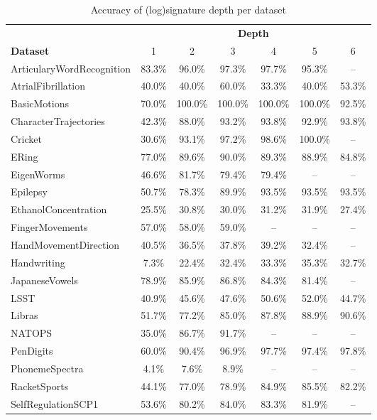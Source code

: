 \documentclass{article}
\theoremstyle{definition}
\theoremstyle{remark}
\begin{document}
	\begin{table}[h]
	\small
	\centering
	\caption{Accuracy of (log)signature depth per dataset}
	\label{tab:complete_results_depth}
	\begin{tabular}{lcccccc}
	\toprule
	& \multicolumn{6}{c}{\textbf{Depth}}\\
	 \cmidrule{2-7}
	\textbf{Dataset} & 1 & 2 & 3 & 4 & 5 & 6 \\
	\midrule
	ArticularyWordRecognition & 83.3\% & 96.0\% & 97.3\% & 97.7\% & 95.3\% & -- \\
	AtrialFibrillation & 40.0\% & 40.0\% & 60.0\% & 33.3\% & 40.0\% & 53.3\% \\
	BasicMotions & 70.0\% & 100.0\% & 100.0\% & 100.0\% & 100.0\% & 92.5\% \\
	CharacterTrajectories & 42.3\% & 88.0\% & 93.2\% & 93.8\% & 92.9\% & 93.8\% \\
	Cricket & 30.6\% & 93.1\% & 97.2\% & 98.6\% & 100.0\% & -- \\
	ERing & 77.0\% & 89.6\% & 90.0\% & 89.3\% & 88.9\% & 84.8\% \\
	EigenWorms & 46.6\% & 81.7\% & 79.4\% & 79.4\% & -- & -- \\
	Epilepsy & 50.7\% & 78.3\% & 89.9\% & 93.5\% & 93.5\% & 93.5\% \\
	EthanolConcentration & 25.5\% & 30.8\% & 30.0\% & 31.2\% & 31.9\% & 27.4\% \\
	FingerMovements & 57.0\% & 58.0\% & 59.0\% & -- & -- & -- \\
	HandMovementDirection & 40.5\% & 36.5\% & 37.8\% & 39.2\% & 32.4\% & -- \\
	Handwriting & 7.3\% & 22.4\% & 32.4\% & 33.3\% & 35.3\% & 32.7\% \\
	JapaneseVowels & 78.9\% & 85.9\% & 86.8\% & 84.3\% & 81.4\% & -- \\
	LSST & 40.9\% & 45.6\% & 47.6\% & 50.6\% & 52.0\% & 44.7\% \\
	Libras & 51.7\% & 77.2\% & 85.0\% & 87.8\% & 88.9\% & 90.6\% \\
	NATOPS & 35.0\% & 86.7\% & 91.7\% & -- & -- & -- \\
	PenDigits & 60.0\% & 90.4\% & 96.9\% & 97.7\% & 97.4\% & 97.8\% \\
	PhonemeSpectra & 4.1\% & 7.6\% & 8.9\% & -- & -- & -- \\
	RacketSports & 44.1\% & 77.0\% & 78.9\% & 84.9\% & 85.5\% & 82.2\% \\
	SelfRegulationSCP1 & 53.6\% & 80.2\% & 84.0\% & 83.3\% & 81.9\% & -- \\

\end{tabular}
\end{table}
\end{document}
